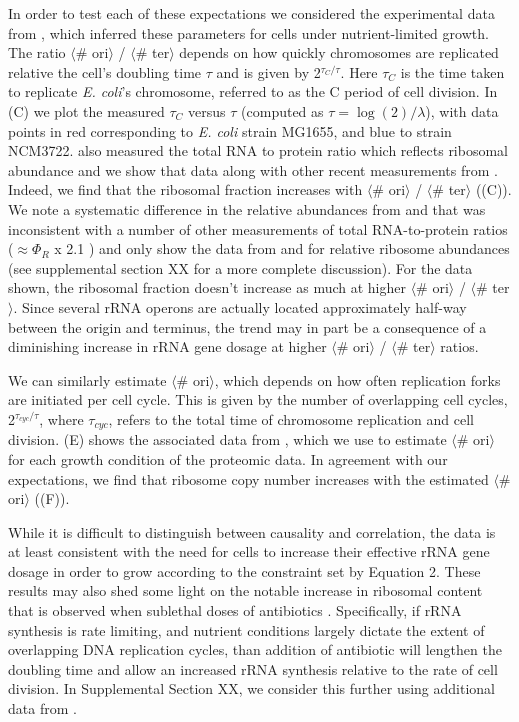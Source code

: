 In order to test each of these expectations we considered the experimental data
from \cite{si2017}, which inferred these parameters for cells under
nutrient-limited growth. The ratio $\langle$\# ori$\rangle$ / $\langle$\#
ter$\rangle$ depends on how quickly chromosomes are replicated relative the
cell's doubling time $\tau$ and is given by 2$^{\tau_C / \tau}$. Here $\tau_C$
is the time taken to replicate \textit{E. coli}'s chromosome, referred to as the
C period of cell division.  In (C) we plot the measured
$\tau_C$ versus $\tau$ (computed as $\tau = \log (2) / \lambda$), with data
points in red corresponding to \textit{E. coli} strain MG1655, and blue to
strain NCM3722. \cite{si2017} also measured the total RNA to protein ratio
which reflects ribosomal abundance and we show that data along with other recent
measurements from \cite{dai2016,dai2018}. Indeed, we find that the ribosomal
fraction increases with $\langle$\# ori$\rangle$ / $\langle$\# ter$\rangle$
((C)). We note a systematic difference in the relative
abundances from \cite{peebo2015} and \cite{valgepea2013} that was inconsistent
with a number of other measurements of total RNA-to-protein ratios ($\approx
\Phi_R$ x 2.1 \cite{dai2016}) and only show the data from \cite{schmidt2016} and
\cite{li2014} for relative ribosome abundances (see supplemental section XX for
a more complete discussion). For the data shown, the ribosomal fraction doesn't
increase as much at higher $\langle$\# ori$\rangle$ / $\langle$\# ter$\rangle$.
Since several rRNA operons are actually located approximately half-way between
the origin and terminus, the trend may in part be a consequence of a diminishing
increase in rRNA gene dosage at higher $\langle$\# ori$\rangle$ / $\langle$\#
ter$\rangle$ ratios.

We can similarly estimate $\langle$\# ori$\rangle$, which depends on how often
replication forks are initiated per cell cycle. This is given by the number of
overlapping cell cycles,  2$^{\tau_{cyc} / \tau}$, where $\tau_{cyc}$, refers to
the total time of chromosome replication and cell division.
(E) shows the associated data from \cite{si2019},
which we use to estimate $\langle$\# ori$\rangle$  for each growth condition of
the proteomic data. In agreement with our expectations, we find that ribosome
copy number increases with the estimated $\langle$\# ori$\rangle$
((F)).

While it is difficult to distinguish between causality and correlation, the data
is at least consistent with the need for cells to increase their effective rRNA
gene dosage in order to grow according to the constraint set by Equation 2.
These results may also shed some light on the notable increase in ribosomal
content that is observed when sublethal doses of antibiotics \citep{scott2010,
dai2016}. Specifically, if rRNA synthesis is rate limiting, and nutrient
conditions largely dictate the extent of overlapping DNA replication cycles,
than addition of antibiotic will lengthen the doubling time and allow an
increased rRNA synthesis relative to the rate
of cell division. In Supplemental Section XX, we consider this further using
additional data from \cite{si2017}.

